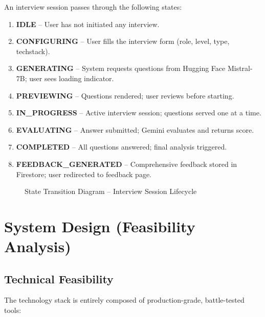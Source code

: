 \documentclass[12pt,a4paper,oneside]{report}
\begin{document}
An interview session passes through the following states:

\begin{enumerate}
  \item \textbf{IDLE} -- User has not initiated any interview.
  \item \textbf{CONFIGURING} -- User fills the interview form (role, level, type, techstack).
  \item \textbf{GENERATING} -- System requests questions from Hugging Face Mistral-7B; user sees loading indicator.
  \item \textbf{PREVIEWING} -- Questions rendered; user reviews before starting.
  \item \textbf{IN\_PROGRESS} -- Active interview session; questions served one at a time.
  \item \textbf{EVALUATING} -- Answer submitted; Gemini evaluates and returns score.
  \item \textbf{COMPLETED} -- All questions answered; final analysis triggered.
  \item \textbf{FEEDBACK\_GENERATED} -- Comprehensive feedback stored in Firestore; user redirected to feedback page.
\end{enumerate}

\begin{figure}[H]
\centering
{}
\caption{State Transition Diagram -- Interview Session Lifecycle}
\label{fig:state_machine}
\end{figure}


\section{System Design (Feasibility Analysis)}
\label{sec:feasibility}

\subsection{Technical Feasibility}

The technology stack is entirely composed of production-grade, battle-tested tools:
\end{document}
